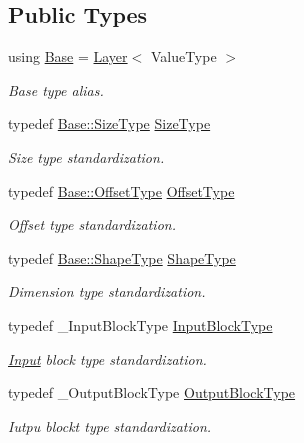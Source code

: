 \subsection*{Public Types}
\begin{DoxyCompactItemize}
\item 
using \hyperlink{classffnn_1_1layer_1_1_hidden_ac51b180aa7de47794148e32616f0441f}{Base} = \hyperlink{classffnn_1_1layer_1_1_layer}{Layer}$<$ Value\-Type $>$
\begin{DoxyCompactList}\small\item\em Base type alias. \end{DoxyCompactList}\item 
typedef \hyperlink{classffnn_1_1layer_1_1_layer_aeccac281d4220fab9cebf78b004c09d1}{Base\-::\-Size\-Type} \hyperlink{classffnn_1_1layer_1_1_hidden_a3deb1dc4b3a83b3d6749474debee025f}{Size\-Type}
\begin{DoxyCompactList}\small\item\em Size type standardization. \end{DoxyCompactList}\item 
typedef \hyperlink{classffnn_1_1layer_1_1_layer_a0e35ffd6e0657856f3a75323b2db9fcb}{Base\-::\-Offset\-Type} \hyperlink{classffnn_1_1layer_1_1_hidden_a4a191bc002b2545231a3d80c99004693}{Offset\-Type}
\begin{DoxyCompactList}\small\item\em Offset type standardization. \end{DoxyCompactList}\item 
typedef \hyperlink{classffnn_1_1layer_1_1_layer_ab0b09d33e24cc8ea2b4e236ca4016ab9}{Base\-::\-Shape\-Type} \hyperlink{classffnn_1_1layer_1_1_hidden_a7ed1a797fcb7bfb43d66c0eb24967882}{Shape\-Type}
\begin{DoxyCompactList}\small\item\em Dimension type standardization. \end{DoxyCompactList}\item 
typedef \-\_\-\-Input\-Block\-Type \hyperlink{classffnn_1_1layer_1_1_hidden_a01b9cc4df01a7b26423dcd3a0af17b1c}{Input\-Block\-Type}
\begin{DoxyCompactList}\small\item\em \hyperlink{classffnn_1_1layer_1_1_input}{Input} block type standardization. \end{DoxyCompactList}\item 
typedef \-\_\-\-Output\-Block\-Type \hyperlink{classffnn_1_1layer_1_1_hidden_abb03ddc71360cc7ebdab03cd4d1553ee}{Output\-Block\-Type}
\begin{DoxyCompactList}\small\item\em Iutpu blockt type standardization. \end{DoxyCompactList}\end{DoxyCompactItemize}

